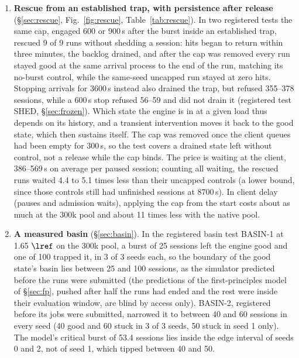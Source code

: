 \begin{enumerate}[label=(\arabic*),leftmargin=*]
\item \textbf{Rescue from an established trap, with persistence after release} (\S\ref{sec:rescue}, Fig.~\ref{fig:rescue}, Table~\ref{tab:rescue}). In two registered tests the same cap, engaged 600 or 900\,s after the burst inside an established trap, rescued 9 of 9 runs without shedding a session: hits began to return within three minutes, the backlog drained, and after the cap was removed every run stayed good at the same arrival process to the end of the run, matching its no-burst control, while the same-seed uncapped run stayed at zero hits. Stopping arrivals for 3600\,s instead also drained the trap, but refused 355--378 sessions, while a 600\,s stop refused 56--59 and did not drain it (registered test SHED, \S\ref{sec:frozen}). Which state the engine is in at a given load thus depends on its history, and a transient intervention moves it back to the good state, which then sustains itself. The cap was removed once the client queues had been empty for 300\,s, so the test covers a drained state left without control, not a release while the cap binds. The price is waiting at the client, 386--569\,s on average per paused session; counting all waiting, the rescued runs waited 4.4 to 5.1 times less than their uncapped controls (a lower bound, since those controls still had unfinished sessions at 8700\,s). In client delay (pauses and admission waits), applying the cap from the start costs about as much at the 300k pool and about 11 times less with the native pool.
\item \textbf{A measured basin} (\S\ref{sec:basin}). In the registered basin test BASIN-1 at 1.65 $\lref$ on the 300k pool, a burst of 25 sessions left the engine good and one of 100 trapped it, in 3 of 3 seeds each, so the boundary of the good state's basin lies between 25 and 100 sessions, as the simulator predicted before the runs were submitted (the predictions of the first-principles model of \S\ref{sec:fp}, pushed after half the runs had ended and the rest were inside their evaluation window, are blind by access only). BASIN-2, registered before its jobs were submitted, narrowed it to between 40 and 60 sessions in every seed (40 good and 60 stuck in 3 of 3 seeds, 50 stuck in seed 1 only). The model's critical burst of 53.4 sessions lies inside the edge interval of seeds 0 and 2, not of seed 1, which tipped between 40 and 50.

\end{enumerate}
